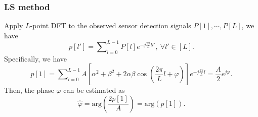 \documentclass[12pt,draftclsnofoot,journal,onecolumn]{IEEEtran}
\theoremstyle{nonumberplain}
\def \arg {\text{arg}}
\begin{document}
\subsubsection{LS method}
Apply $L$-point \ac{DFT} to the observed sensor detection signals $P[1],\cdots ,P[L]$, we have
\begin{equation}
\label{DFT}
p[l']=\sum\nolimits_{l=0}^{L-1}P[l]e^{-j\frac{2\pi}{L}ll'},~\forall l'\in [L].
\end{equation}
Specifically, we have
\begin{equation}
\label{DFT l=1}
p[1]=\sum\nolimits_{l=0}^{L-1}A\left[\alpha^{2}+\beta^{2}+2\alpha\beta\cos\left(\frac{2\pi}{L}l+\varphi\right)\right]e^{-j\frac{2\pi}{L}l}=\frac{A}{2}e^{j\varphi}.
\end{equation}
Then, the phase $\varphi$ can be estimated as
\begin{equation}
\label{LS estimate result}
\hat{\varphi}=\arg\left(\frac{2p[1]}{A}\right) = \arg\left(p[1]\right).
\end{equation}

\end{document}
